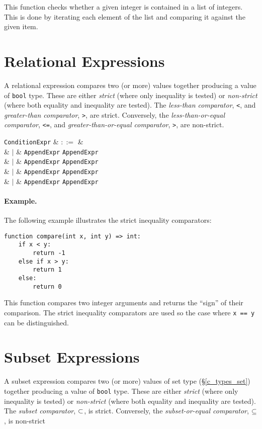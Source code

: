 This function checks whether a given integer is contained in a list of integers.  This is done by iterating each element of the list and comparing it against the given item.


\section{Relational Expressions}
\label{c_expr_relational}
A relational expression compares two (or more) values together producing a value of \lstinline{bool} type.  These are either {\em strict} (where only inequality is tested)  or {\em non-strict} (where both equality and inequality are tested).  The {\em less-than comparator}, \lstinline{<}, and {\em greater-than comparator}, \lstinline{>}, are strict.  Conversely, the {\em less-than-or-equal comparator}, \lstinline{<=}, and {\em greater-than-or-equal comparator}, \lstinline{>}, are non-strict.

\begin{syntax}
  \verb+ConditionExpr+ & $::=$ &\\
  & $|$ & \verb+AppendExpr+ \token{<} \verb+AppendExpr+\\
  & $|$ & \verb+AppendExpr+ \token{<=} \verb+AppendExpr+\\
  & $|$ & \verb+AppendExpr+ \token{=>} \verb+AppendExpr+\\
  & $|$ & \verb+AppendExpr+ \token{>} \verb+AppendExpr+\\
\end{syntax}

\paragraph{Example.} The following example illustrates the strict inequality comparators:

\begin{lstlisting}
function compare(int x, int y) => int:
    if x < y:
        return -1
    else if x > y:
        return 1
    else:
        return 0
\end{lstlisting}

This function compares two integer arguments and returns the ``sign'' of their comparison.  The strict inequality comparators are used so the case where \lstinline{x == y} can be distinguished.

\section{Subset Expressions}
\label{c_expr_relational}
A subset expression compares two (or more) values of set type (\S\ref{c_types_set}) together producing a value of \lstinline{bool} type.  These are either {\em strict} (where only inequality is tested)  or {\em non-strict} (where both equality and inequality are tested).  The {\em subset comparator}, ${\tt\subset}$, is strict.  Conversely, the {\em subset-or-equal comparator}, ${\tt\subseteq}$, is non-strict

